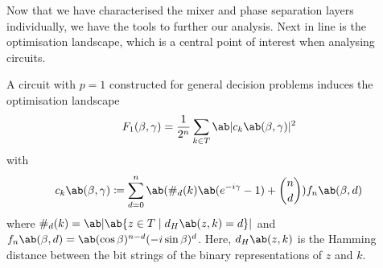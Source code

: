 Now that we have characterised the mixer and phase separation layers individually, we have the tools to further our analysis. Next in line is the optimisation landscape, which is a central point of interest when analysing \QAOA circuits.

\begin{lemma}
  \label{thm:optimisation_landscape}
  A \QAOA circuit with $p=1$ constructed for general decision problems induces the optimisation landscape
  \begin{equation}
    \label{eq:F_1}
    F_1(\mangle, \pangle) = \frac{1}{2^n} \sum_{k \in T} \ab|c_k\ab(\mangle,\pangle)|^2
  \end{equation}
%
  with 
  \begin{equation}
    \label{eq:c_k}
      c_k\ab(\mangle,\pangle) \coloneqq \sum_{d=0}^n \ab(\#_d (k) \ab(e^{-i \pangle} - 1) + \binom{n}{d}) f_n \ab(\mangle, d)
  \end{equation}
    where $\#_d (k) = \ab|\ab\{z \in T \mid d_H\ab(z,k) = d \}|$ and $f_n \ab(\mangle, d) = \ab(\cos \mangle)^{n-d} (-i \sin \mangle)^d$. Here, $d_H\ab(z,k)$ is the Hamming distance between the bit strings of the binary representations of $z$ and $k$.
\end{lemma}


